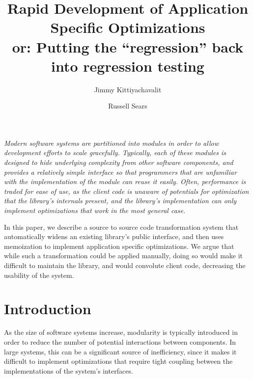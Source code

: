 \documentclass[10pt,letterpaper,twocolumn,english]{article}
\begin{document}
\title{\vspace*{-36pt}Rapid Development of Application Specific Optimizations\\
\vspace*{9pt}
\large{or: Putting the ``regression'' back into regression testing}}
\author{Jimmy Kittiyachavalit \and Russell Sears}
\maketitle




{\em 
Modern software systems are partitioned into modules in order to allow
development efforts to scale gracefully.  Typically, each of these
modules is designed to hide underlying complexity from other software
components, and provides a relatively simple interface so that
programmers that are unfamiliar with the implementation of the module
can reuse it easily. Often, performance is traded for ease of use, as
the client code is unaware of potentials for optimization that the
library's internals present, and the library's implementation can only
implement optimizations that work in the most general case.

In this paper, we describe a source to source code transformation
system that automatically widens an existing library's public
interface, and then uses memoization to implement application specific
optimizations.  We argue that while such a transformation could be
applied manually, doing so would make it difficult to maintain the
library, and would convolute client code, decreasing the usability of
the system.
}


\section{Introduction}
\label {intro}

As the size of software systems increase, modularity is typically
introduced in order to reduce the number of potential interactions
between components.  In large systems, this can be a significant
source of inefficiency, since it makes it difficult to implement
optimizations that require tight coupling between the implementations
of the system's interfaces.
\end{document}
